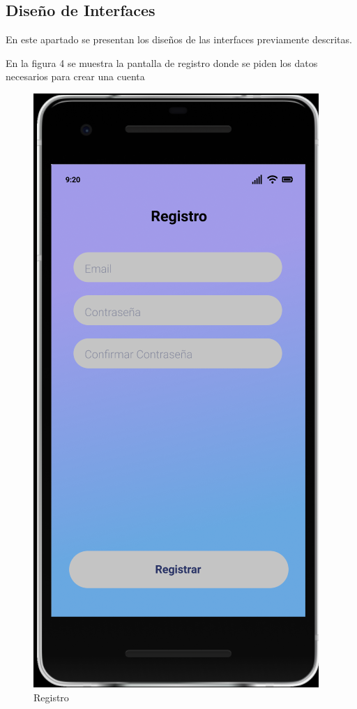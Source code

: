 \documentclass{article}
\begin{document}
\subsection{Diseño de Interfaces}%
En este apartado se presentan los diseños de las interfaces previamente descritas.
\pagebreak

En la figura 4 se muestra la pantalla de registro donde se piden los datos necesarios para crear una cuenta
\begin{figure}[H]
    \centering
    \includegraphics[scale=0.7]{imgs/Figma/Registro2} 
    \caption{Registro}
\end{figure}
\end{document}
